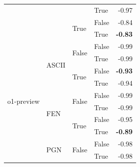 \begin{tabular}{@{}llllr@{}}
                                    &                           &                           & True                      & -0.97 \\
                                    &                           & \multirow[c]{2}{*}{True}  & False                     & -0.84 \\
                                    &                           &                           & True                      & \textbf{-0.83} \\
    \midrule                                                                                                               
    \multirow[c]{13}{*}{o1-preview} & \multirow[c]{4}{*}{ASCII} & \multirow[c]{2}{*}{False} & False                     & -0.99 \\
                                    &                           &                           & True                      & -0.99 \\
                                    &                           & \multirow[c]{2}{*}{True}  & False                     & \textbf{-0.93} \\
                                    &                           &                           & True                      & -0.94 \\
    \cmidrule{2-5}                                                                                                         
                                    & \multirow[c]{4}{*}{FEN}   & \multirow[c]{2}{*}{False} & False                     & -0.99 \\
                                    &                           &                           & True                      & -0.99 \\
                                    &                           & \multirow[c]{2}{*}{True}  & False                     & -0.95 \\
                                    &                           &                           & True                      & \textbf{-0.89} \\
    \cmidrule{2-5}                                                                                                         
                                    & \multirow[c]{4}{*}{PGN}   & \multirow[c]{2}{*}{False} & False                     & -0.98 \\
                                    &                           &                           & True                      & -0.98 \\

\end{tabular}
